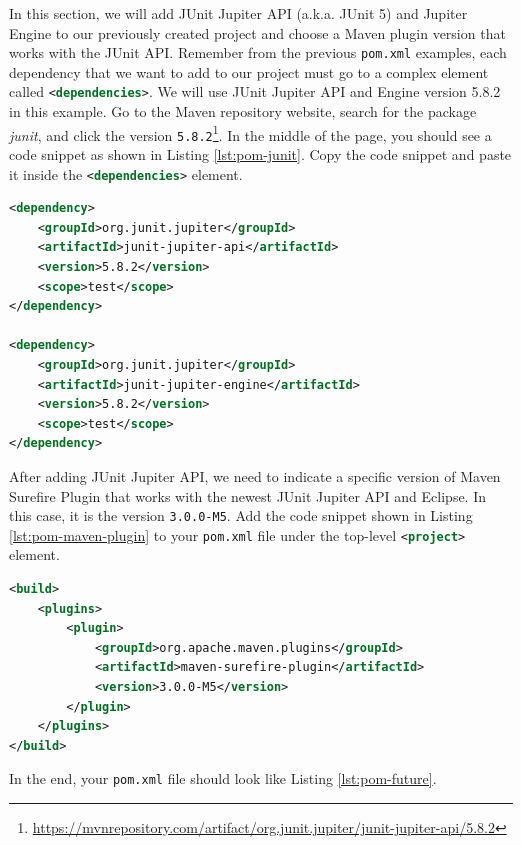 In this section, we will add JUnit Jupiter API (a.k.a. JUnit 5) and Jupiter Engine to our previously created project and choose a Maven plugin version that works with the JUnit API. Remember from the previous \lstinline[language={}]|pom.xml| examples, each dependency that we want to add to our project must go to a complex element called \lstinline[language=XML]|<dependencies>|. We will use JUnit Jupiter API and Engine version 5.8.2 in this example. Go to the Maven repository website, search for the package \emph{junit}, and click the version \lstinline[language={}]|5.8.2|\footnote{\url{https://mvnrepository.com/artifact/org.junit.jupiter/junit-jupiter-api/5.8.2}}. In the middle of the page, you should see a code snippet as shown in Listing \ref{lst:pom-junit}. Copy the code snippet and paste it inside the \lstinline[language=XML]|<dependencies>| element.

\begin{lstlisting}[language=XML,caption={JUnit Jupiter API and Engine version 5.8.2 dependency elements.},label=lst:pom-junit]
<dependency>
    <groupId>org.junit.jupiter</groupId>
    <artifactId>junit-jupiter-api</artifactId>
    <version>5.8.2</version>
    <scope>test</scope>
</dependency>

<dependency>
    <groupId>org.junit.jupiter</groupId>
    <artifactId>junit-jupiter-engine</artifactId>
    <version>5.8.2</version>
    <scope>test</scope>
</dependency>
\end{lstlisting}

After adding JUnit Jupiter API, we need to indicate a specific version of Maven Surefire Plugin that works with the newest JUnit Jupiter API and Eclipse. In this case, it is the version \lstinline[language={}]|3.0.0-M5|. Add the code snippet shown in Listing \ref{lst:pom-maven-plugin} to your \lstinline[language={}]|pom.xml| file under the top-level \lstinline[language=XML]|<project>| element.

\begin{lstlisting}[language=XML,caption={A compatible Maven Surefire Plugin with Eclipse and JUnit Jupiter API v5.8.2..},label=lst:pom-maven-plugin]
<build>
    <plugins>
        <plugin>
            <groupId>org.apache.maven.plugins</groupId>
            <artifactId>maven-surefire-plugin</artifactId>
            <version>3.0.0-M5</version>
        </plugin>
    </plugins>
</build>
\end{lstlisting}

In the end, your \lstinline[language={}]|pom.xml| file should look like Listing \ref{lst:pom-future}.

